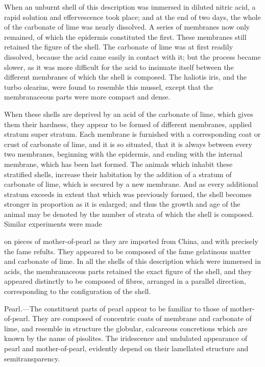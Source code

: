 \documentclass{article}
\begin{document}
When an unburnt shell of this description was immersed in diluted nitric acid, a rapid solution and effervescence took place; and at the end of two days, the whole of the carbonate of lime was nearly dissolved. A series of membranes now only remained, of which the epidermis constituted the first. These membranes still retained the figure of the shell. The carbonate of lime was at first readily dissolved, because the acid came easily in contact with it; but the process became slower, as it was more difficult for the acid to insinuate itself between the different membranes of which the shell is composed. The haliotis iris, and the turbo olearius, were found to resemble this mussel, except that the membranaceous parts were more compact and dense.

When these shells are deprived by an acid of the carbonate of lime, which gives them their hardness, they appear to be formed of different membranes, applied stratum super stratum. Each membrane is furnished with a corresponding coat or crust of carbonate of lime, and it is so situated, that it is always between every two membranes, beginning with the epidermis, and ending with the internal membrane, which has been last formed. The animals which inhabit these stratified shells, increase their habitation by the addition of a stratum of carbonate of lime, which is secured by a new membrane. And as every additional stratum exceeds in extent that which was previously formed, the shell becomes stronger in proportion as it is enlarged; and thus the growth and age of the animal may be denoted by the number of strata of which the shell is composed. Similar experiments were made

on pieces of mother-of-pearl as they are imported from China, and with precisely the fame refults. They appeared to be composed of the fame gelatinous matter and carbonate of lime. In all the shells of this description which were immersed in acids, the membranaceous parts retained the exact figure of the shell, and they appeared distinctly to be composed of fibres, arranged in a parallel direction, corresponding to the configuration of the shell.

Pearl.—The constituent parts of pearl appear to be familiar to those of mother-of-pearl. They are composed of concentric coats of membrane and carbonate of lime, and resemble in structure the globular, calcareous concretions which are known by the name of pisolites. The iridescence and undulated appearance of pearl and mother-of-pearl, evidently depend on their lamellated structure and semitransparency.
\end{document}
